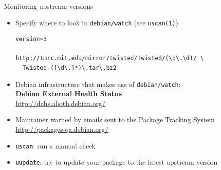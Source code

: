 \documentclass[10pt,final]{beamer}
\begin{document}
\begin{frame}[fragile=singleslide]{Monitoring upstream versions}
  \begin{itemize}
  \item Specify where to look in \texttt{debian/watch} (see \texttt{uscan(1)})
    \begin{lstlisting}[basicstyle=\ttfamily\footnotesize]
version=3

http://tmrc.mit.edu/mirror/twisted/Twisted/(\d\.\d)/ \
  Twisted-([\d\.]*)\.tar\.bz2
    \end{lstlisting}
    \br
  \item Debian infrastructure that makes use of \texttt{debian/watch}:\\
    \textbf{Debian External Health Status}\\
    \url{http://dehs.alioth.debian.org/}
    \br
  \item Maintainer warned by emails sent to the Package Tracking System\\
    \url{http://packages.qa.debian.org/}
    \br
  \item \texttt{uscan}: run a manual check
    \br
  \item \texttt{uupdate}: try to update your package to the latest upstream version
  \end{itemize}
\end{frame}
\end{document}
